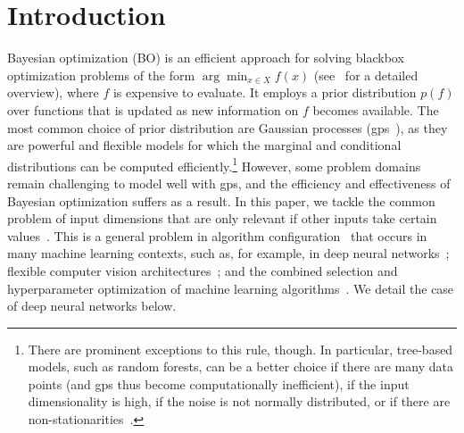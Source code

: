 \documentclass{article}
\newcommand{\gp}{{\sc gp}}
\begin{document}
\section{Introduction}
\vspace{-0.05in} 


Bayesian optimization (BO) is an efficient approach for solving blackbox optimization problems of the form $\arg\min_{x \in X} f(x)$ (see~\cite{Brochu2010} for a detailed overview), where $f$ is expensive to evaluate. 
It employs a prior distribution $p(f)$ over functions that is updated as new information on $f$ becomes available.
%
The most common choice of prior distribution are Gaussian processes (\gp s~\cite{rasmussen38gaussian}), as they are powerful and flexible models for which the marginal and conditional distributions can be computed efficiently.\footnote{There are prominent exceptions to this rule, though. In particular, tree-based models, such as random forests, can be a better choice if there are many data points (and \gp s thus become computationally inefficient), if the input dimensionality is high, if the noise is not normally distributed, or if there are non-stationarities~\cite{TadGraPol11,HutHooLey11,BerEtAl11}.}
%
However, some problem domains remain challenging to model well with \gp s, and the efficiency and effectiveness of Bayesian optimization suffers as a result. In this paper, we tackle the common problem of input dimensions that are only relevant if other inputs take certain values~\cite{Hut09:phd,BergstraJ2011}. This is a general problem in algorithm configuration~\cite{Hut09:phd} that occurs in many machine learning contexts, such as, for example, in deep neural networks~\cite{HinOsiTeh06}; flexible computer vision architectures~\cite{BerYamCox13}; and the combined selection and hyperparameter optimization of machine learning algorithms~\cite{ThoEtAl13}. We detail the case of deep neural networks below.
\end{document}
